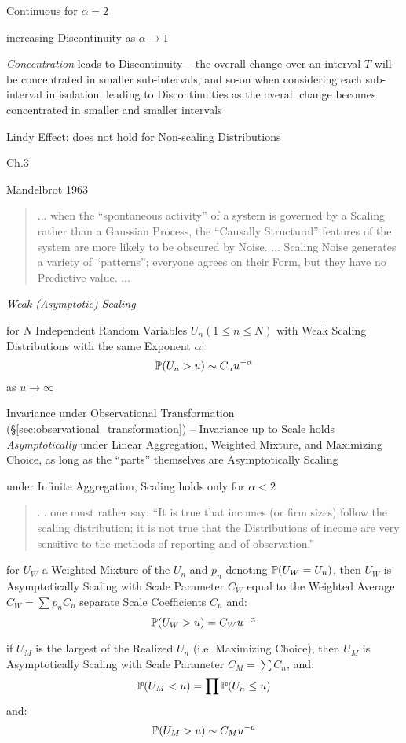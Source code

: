 Continuous for $\alpha = 2$

increasing Discontinuity as $\alpha \to 1$

\emph{Concentration} leads to Discontinuity -- the overall change over an
interval $T$ will be concentrated in smaller sub-intervals, and so-on when
considering each sub-interval in isolation, leading to Discontinuities as the
overall change becomes concentrated in smaller and smaller intervals

Lindy Effect: does not hold for Non-scaling Distributions

Ch.3

Mandelbrot 1963

\begin{quote}
  ... when the ``spontaneous activity'' of a system is governed by a Scaling
  rather than a Gaussian Process, the ``Causally Structural'' features of the
  system are more likely to be obscured by Noise. ... Scaling Noise generates a
  variety of ``patterns''; everyone agrees on their Form, but they have no
  Predictive value. ...
\end{quote}

\emph{Weak (Asymptotic) Scaling}

for $N$ Independent Random Variables $U_n(1 \leq n \leq N)$ with Weak Scaling
Distributions with the same Exponent $\alpha$:
\[
  \mathbb{P}(U_n > u) \sim C_n u^{-\alpha}
\]
as $u \to \infty$

Invariance under Observational Transformation
(\S\ref{sec:observational_transformation}) -- Invariance up to Scale holds
\emph{Asymptotically} under Linear Aggregation, Weighted Mixture, and Maximizing
Choice, as long as the ``parts'' themselves are Asymptotically Scaling

under Infinite Aggregation, Scaling holds only for $\alpha < 2$

\begin{quote}
  ... one must rather say: ``It is true that incomes (or firm sizes) follow the
  scaling distribution; it is not true that the Distributions of income are very
  sensitive to the methods of reporting and of observation.''
\end{quote}

for $U_W$ a Weighted Mixture of the $U_n$ and $p_n$ denoting $\mathbb{P}(U_W = U_n)$,
then $U_W$ is Asymptotically Scaling with Scale Parameter $C_W$ equal to the
Weighted Average $C_W = \sum p_n C_n$ separate Scale Coefficients $C_n$ and:
\[
  \mathbb{P}(U_W > u) = C_W u^{-\alpha}
\]

if $U_M$ is the largest of the Realized $U_n$ (i.e. Maximizing Choice), then
$U_M$ is Asymptotically Scaling with Scale Parameter $C_M = \sum C_n$, and:
\[
  \mathbb{P}(U_M < u) = \prod \mathbb{P}(U_n \leq u)
\]
and:
\[
  \mathbb{P}(U_M > u) \sim C_M u^{-a}
\]

